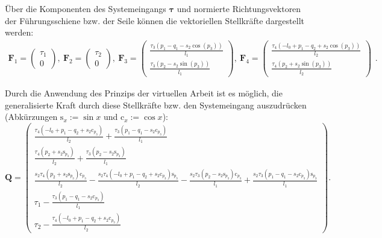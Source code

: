 Über die Komponenten des Systemeingangs $\boldsymbol{\tau}$ und normierte Richtungsvektoren der Führungsschiene bzw. der Seile können die vektoriellen Stellkräfte dargestellt werden:
\begin{equation}
\begin{smallmatrix}
\mathbf{F}_1 =
\left(\begin{matrix}
\tau_{1} \\
0
\end{matrix}\right), \
\mathbf{F}_2 =
\left(\begin{matrix}
\tau_{2} \\
0
\end{matrix}\right), \
\mathbf{F}_3 =
\left(\begin{matrix}
\frac{\tau_{3} \left(p_{1} - q_{1} - s_{2} \cos{\left(p_{3} \right)}\right)}{l_{1}}\\
\frac{\tau_{3} \left(p_{2} - s_{2} \sin{\left(p_{3} \right)}\right)}{l_{1}}
\end{matrix}\right), \
\mathbf{F}_4 =
\left(\begin{matrix}
\frac{\tau_{4} \left(- l_{0} + p_{1} - q_{2} + s_{2} \cos{\left(p_{3} \right)}\right)}{l_{2}}\\
\frac{\tau_{4} \left(p_{2} + s_{2} \sin{\left(p_{3} \right)}\right)}{l_{2}}
\end{matrix}\right)
\end{smallmatrix}.
\end{equation}

Durch die Anwendung des Prinzips der virtuellen Arbeit ist es möglich, die generalisierte Kraft durch diese Stellkräfte bzw. den Systemeingang auszudrücken (Abkürzungen $\mathrm{s}_x := \sin{x}$ und $\mathrm{c}_x := \cos{x}$):
\begin{equation}
\mathbf{Q}=
\left(\begin{smallmatrix}
\frac{\tau_{4} \left(- l_{0} + p_{1} - q_{2} + s_{2} \mathrm{c}_{p_{3}}\right)}{l_{2}} + \frac{\tau_{3} \left(p_{1} - q_{1} - s_{2} \mathrm{c}_{p_{3}}\right)}{l_{1}}\\
\frac{\tau_{4} \left(p_{2} + s_{2} \mathrm{s}_{p_{3}}\right)}{l_{2}} + \frac{\tau_{3} \left(p_{2} - s_{2} \mathrm{s}_{p_{3}}\right)}{l_{1}}\\
\frac{s_{2} \tau_{4} \left(p_{2} + s_{2} \mathrm{s}_{p_{3}}\right) \mathrm{c}_{p_{3} }}{l_{2}} - \frac{s_{2} \tau_{4} \left(- l_{0} + p_{1} - q_{2} + s_{2} \mathrm{c}_{p_{3} }\right) \mathrm{s}_{p_{3}}}{l_{2}} - \frac{s_{2} \tau_{3} \left(p_{2} - s_{2} \mathrm{s}_{p_{3}}\right) \mathrm{c}_{p_{3}}}{l_{1}} + \frac{s_{2} \tau_{3} \left(p_{1} - q_{1} - s_{2} \mathrm{c}_{p_{3}}\right) \mathrm{s}_{p_{3}}}{l_{1}}\\
\tau_{1} - \frac{\tau_{3} \left(p_{1} - q_{1} - s_{2} \mathrm{c}_{p_{3} }\right)}{l_{1}}\\
\tau_{2} - \frac{\tau_{4} \left(- l_{0} + p_{1} - q_{2} + s_{2} \mathrm{c}_{p_{3} }\right)}{l_{2}}
\end{smallmatrix}\right).
\end{equation}


